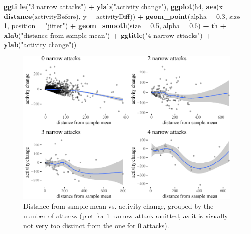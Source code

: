 \documentclass[10pt,]{scrartcl}
\newenvironment{Shaded}{\begin{snugshade}}{\end{snugshade}}
\newcommand{\KeywordTok}[1]{\textcolor[rgb]{0.13,0.29,0.53}{\textbf{#1}}}
\newcommand{\DataTypeTok}[1]{\textcolor[rgb]{0.13,0.29,0.53}{#1}}
\newcommand{\DecValTok}[1]{\textcolor[rgb]{0.00,0.00,0.81}{#1}}
\newcommand{\FloatTok}[1]{\textcolor[rgb]{0.00,0.00,0.81}{#1}}
\newcommand{\StringTok}[1]{\textcolor[rgb]{0.31,0.60,0.02}{#1}}
\newcommand{\OperatorTok}[1]{\textcolor[rgb]{0.81,0.36,0.00}{\textbf{#1}}}
\newcommand{\NormalTok}[1]{#1}
\begin{document}
\begin{Shaded}
\begin{Highlighting}[]
\StringTok{    }\KeywordTok{ggtitle}\NormalTok{(}\StringTok{"3 narrow attacks"}\NormalTok{) }\OperatorTok{+}\StringTok{ }\KeywordTok{ylab}\NormalTok{(}\StringTok{"activity change"}\NormalTok{), }\KeywordTok{ggplot}\NormalTok{(h4,}
    \KeywordTok{aes}\NormalTok{(}\DataTypeTok{x =} \KeywordTok{distance}\NormalTok{(activityBefore), }\DataTypeTok{y =}\NormalTok{ activityDiff)) }\OperatorTok{+}\StringTok{ }\KeywordTok{geom_point}\NormalTok{(}\DataTypeTok{alpha =} \FloatTok{0.3}\NormalTok{,}
    \DataTypeTok{size =} \DecValTok{1}\NormalTok{, }\DataTypeTok{position =} \StringTok{"jitter"}\NormalTok{) }\OperatorTok{+}\StringTok{ }\KeywordTok{geom_smooth}\NormalTok{(}\DataTypeTok{size =} \FloatTok{0.5}\NormalTok{,}
    \DataTypeTok{alpha =} \FloatTok{0.5}\NormalTok{) }\OperatorTok{+}\StringTok{ }\NormalTok{th }\OperatorTok{+}\StringTok{ }\KeywordTok{xlab}\NormalTok{(}\StringTok{"distance from sample mean"}\NormalTok{) }\OperatorTok{+}\StringTok{ }\KeywordTok{ggtitle}\NormalTok{(}\StringTok{"4 narrow attacks"}\NormalTok{) }\OperatorTok{+}
\StringTok{    }\KeywordTok{ylab}\NormalTok{(}\StringTok{"activity change"}\NormalTok{))}
\end{Highlighting}
\end{Shaded}

\normalsize

\begin{figure}

\begin{center}\includegraphics[width=1\linewidth]{redditAnalysisWalkthrough_files/figure-latex/unnamed-chunk-112-1} \end{center}
\caption{Distance from sample mean vs. activity change, grouped by the number of attacks (plot for 1 narrow attack omitted, as it is visually not very too distinct from the one for 0 attacks).}
\label{fig:regression}
\end{figure}
\end{document}
